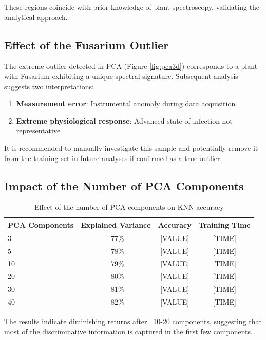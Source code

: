 \documentclass[12pt,a4paper]{article}
\begin{document}
These regions coincide with prior knowledge of plant spectroscopy, validating the analytical approach.

\subsection{Effect of the Fusarium Outlier}

The extreme outlier detected in PCA (Figure \ref{fig:pca3d}) corresponds to a plant with Fusarium exhibiting a unique spectral signature. Subsequent analysis suggests two interpretations:

\begin{enumerate}
    \item \textbf{Measurement error}: Instrumental anomaly during data acquisition
    \item \textbf{Extreme physiological response}: Advanced state of infection not representative
\end{enumerate}

It is recommended to manually investigate this sample and potentially remove it from the training set in future analyses if confirmed as a true outlier.

\subsection{Impact of the Number of PCA Components}

\begin{table}[H]
\centering
\caption{Effect of the number of PCA components on KNN accuracy}
\label{tab:pca_components}
\begin{tabular}{lccc}
\toprule
\textbf{PCA Components} & \textbf{Explained Variance} & \textbf{Accuracy} & \textbf{Training Time} \\
\midrule
3 & ~77\% & [VALUE] & [TIME] \\
5 & ~78\% & [VALUE] & [TIME] \\
10 & ~79\% & [VALUE] & [TIME] \\
20 & ~80\% & [VALUE] & [TIME] \\
30 & ~81\% & [VALUE] & [TIME] \\
40 & ~82\% & [VALUE] & [TIME] \\
\bottomrule
\end{tabular}
\end{table}

The results indicate diminishing returns after ~10-20 components, suggesting that most of the discriminative information is captured in the first few components.
\end{document}
